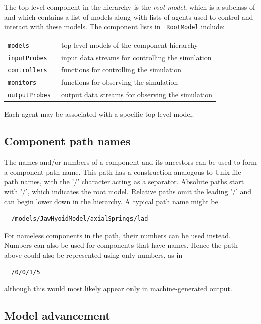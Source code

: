 The top-level component in the hierarchy is the {\it root model},
which is a subclass of 
and which contains a list of models along with lists of agents used to
control and interact with these models. The component lists in {\tt
RootModel} include:

\begin{shadedregion}
\begin{tabular}{ll}
\tt models & top-level models of the component hierarchy \\
\tt inputProbes & input data streams for controlling the simulation \\
\tt controllers & functions for controlling the simulation \\
\tt monitors & functions for observing the simulation \\
\tt outputProbes & output data streams for observing the simulation \\
\end{tabular}
\end{shadedregion}

Each agent may be associated with a specific top-level model.

\subsection{Component path names}
\label{PathNames:sec}

The names and/or numbers of a component and its ancestors can be used to
form a component path name. This path has a construction 
analogous to Unix file path names, with the '/' character acting as a
separator. Absolute paths start with '/', which indicates the root
model. Relative paths omit the leading '/' and can begin lower down
in the hierarchy. A typical path name might be
\begin{verbatim}
  /models/JawHyoidModel/axialSprings/lad
\end{verbatim}
For nameless components in the path, their numbers can be used
instead.  Numbers can also be used for components that have
names. Hence the path above could also be represented using
only numbers, as in
\begin{verbatim}
  /0/0/1/5
\end{verbatim}
although this would most likely appear only in machine-generated
output.

\subsection{Model advancement}
\label{ModelAdvancement:sec}

